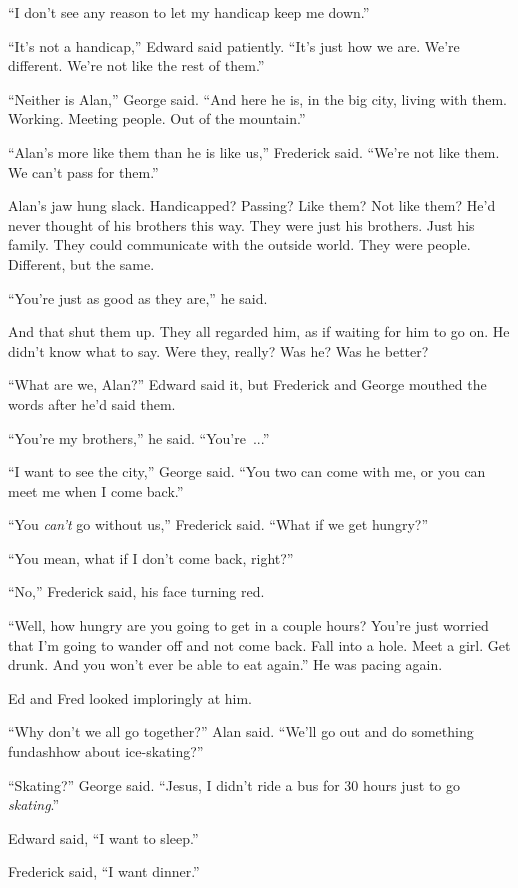 ``I don't see any reason to let my handicap keep me down.''

``It's not a handicap,'' Edward said patiently.  ``It's just how we
are.  We're different.  We're not like the rest of them.''

``Neither is Alan,'' George said.  ``And here he is, in the big city,
living with them.  Working.  Meeting people.  Out of the mountain.''

``Alan's more like them than he is like us,'' Frederick said.  ``We're
not like them.  We can't pass for them.''

Alan's jaw hung slack.  Handicapped?  Passing?  Like them?  Not like
them?  He'd never thought of his brothers this way.  They were just
his brothers.  Just his family.  They could communicate with the
outside world.  They were people.  Different, but the same.

``You're just as good as they are,'' he said.

And that shut them up.  They all regarded him, as if waiting for him
to go on.  He didn't know what to say.  Were they, really?  Was he? 
Was he better?

``What are we, Alan?'' Edward said it, but Frederick and George
mouthed the words after he'd said them.

``You're my brothers,'' he said.  ``You're~...''

``I want to see the city,'' George said.  ``You two can come with me,
or you can meet me when I come back.''

``You \textit{can't} go without us,'' Frederick said.  ``What if we
get hungry?''

``You mean, what if I don't come back, right?''

``No,'' Frederick said, his face turning red.

``Well, how hungry are you going to get in a couple hours?  You're
just worried that I'm going to wander off and not come back.  Fall
into a hole.  Meet a girl.  Get drunk.  And you won't ever be able to
eat again.'' He was pacing again.

Ed and Fred looked imploringly at him.

``Why don't we all go together?'' Alan said.  ``We'll go out and do
something fundash{}how about ice-skating?''

``Skating?'' George said.  ``Jesus, I didn't ride a bus for 30 hours
just to go \textit{skating}.''

Edward said, ``I want to sleep.''

Frederick said, ``I want dinner.''

